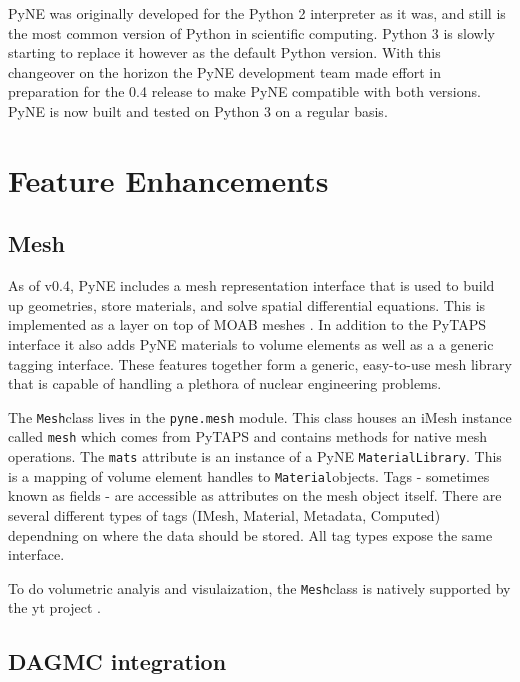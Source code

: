 \documentclass{anstrans}
\newcommand{\Mesh}{\texttt{Mesh}}
\newcommand{\Material}{\texttt{Material}}
\begin{document}
PyNE was originally developed for the Python 2 interpreter as it was, 
and still is the most common version of Python in scientific computing. 
Python 3 is slowly starting to replace it however as the default Python 
version. With this changeover on the horizon the PyNE development team 
made effort in preparation for the 0.4 release to make PyNE compatible 
with both versions. PyNE is now built and tested on Python 3 on a regular basis.

\section{Feature Enhancements}

\subsection{Mesh}

As of v0.4, PyNE includes a mesh representation interface that is used to 
build up geometries, store materials, and solve spatial differential equations.
This is implemented as a layer on top of MOAB meshes \cite{tautges_moab:_2004}.
In addition to the PyTAPS interface \cite{pytaps} it also adds PyNE materials to 
volume elements as well as a a generic tagging interface. These features together 
form a generic, easy-to-use mesh library that is capable of handling a plethora
of nuclear engineering problems.

The \Mesh class lives in the \texttt{pyne.mesh} module. This class houses an 
iMesh instance called \texttt{mesh} which comes from PyTAPS and contains 
methods for native mesh operations. The \texttt{mats} attribute is an 
instance of a PyNE \texttt{MaterialLibrary}. This is a mapping of volume 
element handles to \Material objects. Tags - sometimes known as fields - are 
accessible as attributes on the mesh object itself. There are several different types
of tags (IMesh, Material, Metadata, Computed) dependning on where the data should
be stored.  All tag types expose the same interface. 

To do volumetric analyis and visulaization, the \Mesh class is natively supported 
by the yt project \cite{2011ApJS..192....9T}.


\subsection{DAGMC integration}
\end{document}
